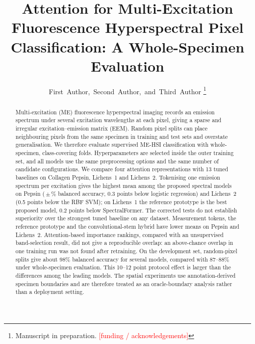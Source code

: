 \documentclass[journal]{IEEEtran}
\newcommand{\RESULT}[1]{\textcolor{red}{[#1]}}
\begin{document}
\title{Attention for Multi-Excitation Fluorescence Hyperspectral Pixel Classification: A Whole-Specimen Evaluation}

\author{First~Author,~Second~Author,~and~Third~Author%
\thanks{Manuscript in preparation. \RESULT{funding / acknowledgements}}}


\maketitle

\begin{abstract}
Multi-excitation (ME) fluorescence hyperspectral imaging records an emission spectrum under several excitation wavelengths at each pixel, giving a sparse and irregular excitation--emission matrix (EEM). Random pixel splits can place neighbouring pixels from the same specimen in training and test sets and overstate generalisation. We therefore evaluate supervised ME-HSI classification with whole-specimen, class-covering folds. Hyperparameters are selected inside the outer training set, and all models use the same preprocessing options and the same number of candidate configurations. We compare four attention representations with 13 tuned baselines on Collagen Pepsin, Lichens~1 and Lichens~2. Tokenising one emission spectrum per excitation gives the highest mean among the proposed spectral models on Pepsin (\BestOursAccPepsinSpectral\,$\pm$\,\BestOursStdPepsinSpectral\% balanced accuracy, 0.3 points below logistic regression) and Lichens~2 (0.5 points below the RBF SVM); on Lichens~1 the reference prototype is the best proposed model, 0.2 points below SpectralFormer. The corrected tests do not establish superiority over the strongest tuned baseline on any dataset. Measurement tokens, the reference prototype and the convolutional-stem hybrid have lower means on Pepsin and Lichens~2. Attention-based importance rankings, compared with an unsupervised band-selection result, did not give a reproducible overlap: an above-chance overlap in one training run was not found after retraining. On the development set, random-pixel splits give about 98\% balanced accuracy for several models, compared with 87--88\% under whole-specimen evaluation. This 10--12 point protocol effect is larger than the differences among the leading models. The spatial experiments use annotation-derived specimen boundaries and are therefore treated as an oracle-boundary analysis rather than a deployment setting.
\end{abstract}
\end{document}
